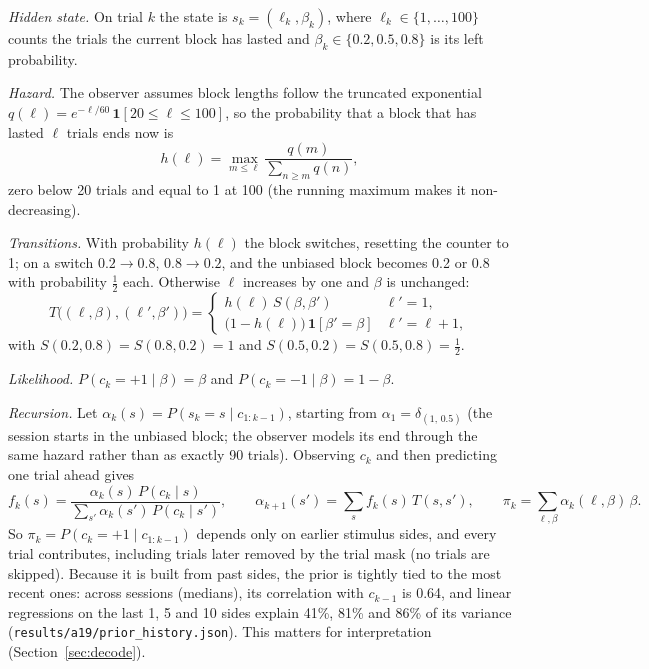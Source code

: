 \documentclass{article}
\begin{document}
\emph{Hidden state.} On trial $k$ the state is $s_k = (\ell_k, \beta_k)$, where $\ell_k \in \{1, \dots, 100\}$ counts
the trials the current block has lasted and $\beta_k \in \{0.2, 0.5, 0.8\}$ is its left probability.

\emph{Hazard.} The observer assumes block lengths follow the truncated exponential
$q(\ell) = e^{-\ell/60}\,\mathbf 1[20 \le \ell \le 100]$, so the probability that a block that has lasted $\ell$
trials ends now is
\begin{equation}
  h(\ell) = \max_{m \le \ell} \frac{q(m)}{\sum_{n \ge m} q(n)} ,
  \label{eq:hazard}
\end{equation}
zero below 20 trials and equal to 1 at 100 (the running maximum makes it non-decreasing).

\emph{Transitions.} With probability $h(\ell)$ the block switches, resetting the counter to 1; on a switch
$0.2 \to 0.8$, $0.8 \to 0.2$, and the unbiased block becomes 0.2 or 0.8 with probability $\tfrac12$ each. Otherwise
$\ell$ increases by one and $\beta$ is unchanged:
\begin{equation}
  T\big((\ell,\beta),(\ell',\beta')\big) =
  \begin{cases}
    h(\ell)\, S(\beta,\beta') & \ell' = 1,\\
    \big(1 - h(\ell)\big)\, \mathbf 1[\beta' = \beta] & \ell' = \ell + 1,
  \end{cases}
  \label{eq:transition}
\end{equation}
with $S(0.2,0.8) = S(0.8,0.2) = 1$ and $S(0.5,0.2) = S(0.5,0.8) = \tfrac12$.

\emph{Likelihood.} $P(c_k = +1 \mid \beta) = \beta$ and $P(c_k = -1 \mid \beta) = 1 - \beta$.

\emph{Recursion.} Let $\alpha_k(s) = P(s_k = s \mid c_{1:k-1})$, starting from $\alpha_1 = \delta_{(1,\,0.5)}$ (the
session starts in the unbiased block; the observer models its end through the same hazard rather than as exactly 90
trials). Observing $c_k$ and then predicting one trial ahead gives
\begin{equation}
  f_k(s) = \frac{\alpha_k(s)\, P(c_k \mid s)}{\sum_{s'} \alpha_k(s')\, P(c_k \mid s')} , \qquad
  \alpha_{k+1}(s') = \sum_s f_k(s)\, T(s, s') , \qquad
  \pi_k = \sum_{\ell,\beta} \alpha_k(\ell,\beta)\, \beta .
  \label{eq:filter}
\end{equation}
So $\pi_k = P(c_k = +1 \mid c_{1:k-1})$ depends only on earlier stimulus sides, and every trial contributes, including
trials later removed by the trial mask (no trials are skipped). Because it is built from past sides, the prior is tightly tied
to the most recent ones: across sessions (medians), its correlation with $c_{k-1}$ is 0.64, and linear regressions on
the last 1, 5 and 10 sides explain 41\%, 81\% and 86\% of its variance (\texttt{results/a19/prior\_history.json}).
This matters for interpretation (Section~\ref{sec:decode}).
\end{document}
